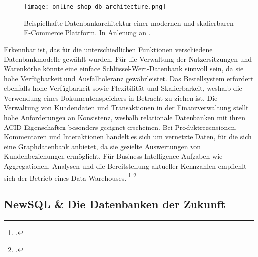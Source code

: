 \begin{figure}[H]
    \centering
    \texttt{[image: online-shop-db-architecture.png]}
    \caption{Beispielhafte Datenbankarchitektur einer modernen und skalierbaren E-Commerce Plattform. In Anlenung an \cite{donofrioBigDataAnalytics2021}.}
\end{figure}

Erkennbar ist, das für die unterschiedlichen Funktionen verschiedene Datenbankmodelle gewählt wurden. Für die Verwaltung der Nutzersitzungen und Warenkörbe könnte eine einface Schlüssel-Wert-Datenbank sinnvoll sein, da sie hohe Verfügbarkeit und Ausfalltoleranz gewährleistet. Das Bestellsystem erfordert ebenfalls hohe Verfügbarkeit sowie Flexibilität und Skalierbarkeit, weshalb die Verwendung eines Dokumentenspeichers in Betracht zu ziehen ist. Die Verwaltung von Kundendaten und Transaktionen in der Finanzverwaltung stellt hohe Anforderungen an Konsistenz, weshalb relationale Datenbanken mit ihren ACID-Eigenschaften besonders geeignet erscheinen. Bei Produktrezensionen, Kommentaren und Interaktionen handelt es sich um vernetzte Daten, für die sich eine Graphdatenbank anbietet, da sie gezielte Auswertungen von Kundenbeziehungen ermöglicht. Für Business-Intelligence-Aufgaben wie Aggregationen, Analysen und die Bereitstellung aktueller Kennzahlen empfiehlt sich der Betrieb eines Data Warehouses. \footcite[S. 8]{donofrioBigDataAnalytics2021} \vspace{0.1cm} \footcite[S. 47]{meierWerkzeugeDigitalenWirtschaft2018}



\subsection{NewSQL \& Die Datenbanken der Zukunft}

